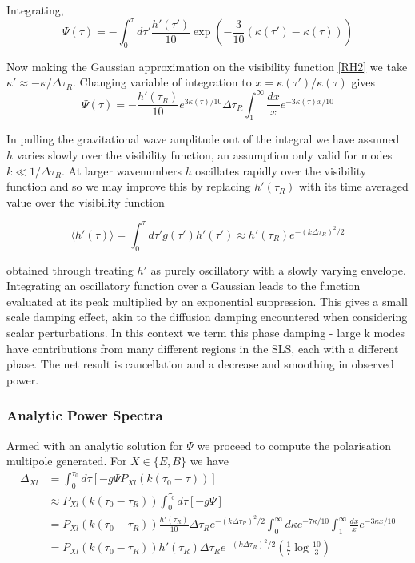 \documentclass[a4paper,10pt]{article}
\begin{document}
Integrating,
\begin{equation}
\Psi(\tau) = -\int_0^\tau d\tau' \frac{h'(\tau')}{10}\exp{\left( -\frac{3}{10}(\kappa(\tau')-\kappa(\tau))\right)}
\end{equation}

Now making the Gaussian approximation on the visibility function \ref{RH2} we take $\kappa'\approx -\kappa/\Delta\tau_R$. Changing variable of integration to $x=\kappa(\tau')/\kappa(\tau)$ gives
\begin{equation}
\Psi(\tau) = -\frac{h'(\tau_R)}{10}e^{3\kappa(\tau)/10}\Delta\tau_R\int_1^\infty\frac{dx}{x}e^{-3\kappa(\tau) x/10}
\end{equation}

In pulling the gravitational wave amplitude out of the integral we have assumed $h$ varies slowly over the visibility function, an assumption only valid for modes $k\ll 1/\Delta\tau_R$. At larger wavenumbers $h$ oscillates rapidly over the visibility function and so we may improve this by replacing $h'(\tau_R)$ with its time averaged value over the visibility function

\begin{equation}
\langle h'(\tau) \rangle = \int_0^{\tau} d\tau' g(\tau')h'(\tau') \approx h'(\tau_R)e^{-(k\Delta\tau_R)^2/2}
\end{equation}

obtained through treating $h'$ as purely oscillatory with a slowly varying envelope. Integrating an oscillatory function over a Gaussian leads to the function evaluated at its peak multiplied by an exponential suppression. This gives a small scale damping effect, akin to the diffusion damping encountered when considering scalar perturbations. In this context we term this phase damping - large k modes have contributions from many different regions in the SLS, each with a different phase. The net result is cancellation and a decrease and smoothing in observed power.\\

\subsubsection{Analytic Power Spectra}


Armed with an analytic solution for $\Psi$ we proceed to compute the polarisation multipole generated. For $X\in\{E,B\}$ we have
\begin{equation}
\begin{split}
\Delta_{Xl} &= \int_0^{\tau_0} d\tau [-g\Psi P_{Xl}(k(\tau_0-\tau))]\\
&\approx P_{Xl}(k(\tau_0-\tau_R)) \int_0^{\tau_0} d\tau [-g\Psi] \\
&= P_{Xl}(k(\tau_0-\tau_R)) \frac{h'(\tau_R)}{10}\Delta\tau_Re^{-(k\Delta\tau_R)^2/2} \int_0^\infty d\kappa e^{-7\kappa/10} \int_1^\infty\frac{dx}{x}e^{-3\kappa x/10}\\
&=P_{Xl}(k(\tau_0-\tau_R)) h'(\tau_R)\Delta\tau_Re^{-(k\Delta\tau_R)^2/2} (\frac{1}{7}\log{\frac{10}{3}})
\end{split}
\end{equation}
\end{document}
